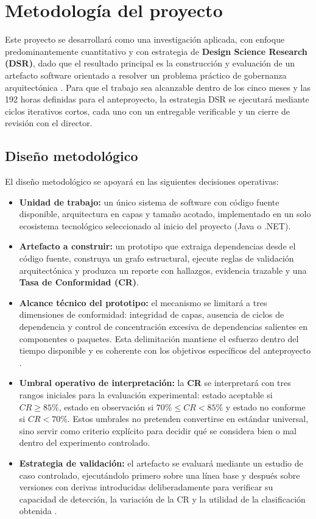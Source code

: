 \section{Metodología del proyecto}

Este proyecto se desarrollará como una investigación aplicada, con enfoque predominantemente cuantitativo y con estrategia de \textbf{Design Science Research (DSR)}, dado que el resultado principal es la construcción y evaluación de un artefacto software orientado a resolver un problema práctico de gobernanza arquitectónica \parencite{Hamed2023, Klein2022}. Para que el trabajo sea alcanzable dentro de los cinco meses y las 192 horas definidas para el anteproyecto, la estrategia DSR se ejecutará mediante ciclos iterativos cortos, cada uno con un entregable verificable y un cierre de revisión con el director.

\subsection{Diseño metodológico}

El diseño metodológico se apoyará en las siguientes decisiones operativas:

\begin{itemize}
    \item \textbf{Unidad de trabajo:} un único sistema de software con código fuente disponible, arquitectura en capas y tamaño acotado, implementado en un solo ecosistema tecnológico seleccionado al inicio del proyecto (Java o .NET).
    \item \textbf{Artefacto a construir:} un prototipo que extraiga dependencias desde el código fuente, construya un grafo estructural, ejecute reglas de validación arquitectónica y produzca un reporte con hallazgos, evidencia trazable y una \textbf{Tasa de Conformidad (CR)}.
    \item \textbf{Alcance técnico del prototipo:} el mecanismo se limitará a tres dimensiones de conformidad: integridad de capas, ausencia de ciclos de dependencia y control de concentración excesiva de dependencias salientes en componentes o paquetes. Esta delimitación mantiene el esfuerzo dentro del tiempo disponible y es coherente con los objetivos específicos del anteproyecto \parencite{Anthony2024, Sas2019}.
    \item \textbf{Umbral operativo de interpretación:} la \textbf{CR} se interpretará con tres rangos iniciales para la evaluación experimental: estado aceptable si $CR \geq 85\%$, estado en observación si $70\% \leq CR < 85\%$ y estado no conforme si $CR < 70\%$. Estos umbrales no pretenden convertirse en estándar universal, sino servir como criterio explícito para decidir qué se considera bien o mal dentro del experimento controlado.
    \item \textbf{Estrategia de validación:} el artefacto se evaluará mediante un estudio de caso controlado, ejecutándolo primero sobre una línea base y después sobre versiones con derivas introducidas deliberadamente para verificar su capacidad de detección, la variación de la CR y la utilidad de la clasificación obtenida \parencite{Pigazzini2021, SasAvgeriou}.
\end{itemize}

